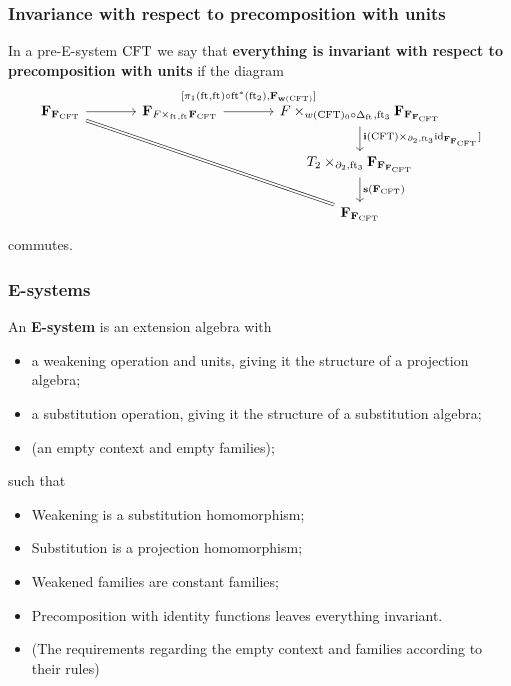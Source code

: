 \documentclass[handout]{beamer}
\newcommand\important[1]{\textbf{\color{red!90!black}#1}}
\begin{document}
\begin{frame}
\frametitle{\bf Invariance with respect to precomposition with units}
In a pre-E-system $\mathrm{CFT}$ we say that \important{everything is invariant
with respect to precomposition with units} if the diagram
\begin{equation*}
\begin{tikzcd}[ampersand replacement=\&,column sep=large]
\famesys{\famesys{\stesys}}
  \ar{r}
  \ar[equals]{ddrr}
  \&
\famesys{\cobesys{\stesysf}{\famesys{\stesys}}{\eft}{\eft}}
  \ar{r}[yshift=1ex]{[\pullbackpr{1}{\eft}{\eft}\circ\eft^\ast(\eft[2]),\famehom{\mathbf{w}(\stesys)}]}
  \&
\cobesys
  {\stesysf}
  {\famesys{\famesys{\famesys{\stesys}}}}
  {w(\stesys)_0\circ\Delta_{\eft}}
  {\eft[3]}
  \ar{d}{\pullback{\mathbf{i}(\stesys)}{\catid{\famesys{\famesys{\stesys}}}]}{\ebd[2]}{\eft[3]}}
  \\
  {}\&
  {}\&
\cobesys{\stesyst_2}{\famesys{\famesys{\famesys{\stesys}}}}{\ebd[2]}{\eft[3]}
  \ar{d}{\mathbf{s}(\famesys{\stesys})}
  \\
  {}\&
  {}\&
\famesys{\famesys{\stesys}}
\end{tikzcd}
\end{equation*}
commutes.
\end{frame}

\begin{frame}
\frametitle{\bf E-systems}
An \important{E-system} is an extension algebra with\pause
\begin{itemize}
\item a weakening operation and units, giving it the structure of a projection algebra;\pause
\item a substitution operation, giving it the structure of a substitution algebra;\pause
\item (an empty context and empty families);
\end{itemize}
such that\pause
\begin{itemize}
\item Weakening is a substitution homomorphism;\pause
\item Substitution is a projection homomorphism;\pause
\item Weakened families are constant families;\pause
\item Precomposition with identity functions leaves everything invariant.\pause
\item (The requirements regarding the empty context and families according to their rules)
\end{itemize}
\end{frame}
\end{document}

